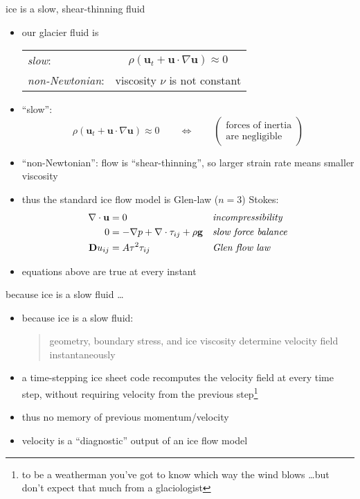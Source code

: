 \documentclass[hide notes,intlimits]{beamer}
\begin{document}
\begin{frame}{ice is a slow, shear-thinning fluid}

\begin{itemize}
\item our glacier fluid is
\smallskip

  \begin{tabular}{lc}
  \emph{slow}: & $\rho \left(\mathbf{u}_t + \mathbf{u}\cdot\nabla \mathbf{u}\right) \approx 0$ \\
  \emph{non-Newtonian}: & viscosity $\nu$ is not constant
  \end{tabular}
\item ``slow'':
  $$\rho \left(\mathbf{u}_t + \mathbf{u}\cdot\nabla \mathbf{u}\right) \approx 0 \qquad \iff \qquad \begin{pmatrix} \text{forces of inertia} \\ \text{are negligible} \end{pmatrix}$$
\item ``non-Newtonian'': flow is ``shear-thinning'', so larger strain rate means smaller viscosity
\item thus the standard ice flow model is Glen-law ($n=3$) Stokes:
\begin{align*}
\nabla \cdot \mathbf{u} &= 0 &&\text{\emph{incompressibility}} \\
0 &= - \nabla p + \nabla \cdot \tau_{ij} + \rho \mathbf{g} &&\text{\emph{slow force balance}} \\
\mathbf{D}u_{ij} &= A \tau^2 \tau_{ij} &&\text{\emph{Glen flow law}}
\end{align*}
\item equations above are true at every instant
\end{itemize}
\end{frame}


\begin{frame}{because ice is a slow fluid \dots}

\begin{itemize}
\item because ice is a slow fluid:
  \begin{quote}
  \alert{geometry, boundary stress, and ice viscosity determine velocity field instantaneously}
  \end{quote}
\item a time-stepping ice sheet code recomputes the velocity field at every time step, without requiring velocity from the previous step\footnote{to be a weatherman you've got to know which way the wind blows \dots but don't expect that much from a glaciologist}
\item thus no memory of previous momentum/velocity
\item velocity is a ``diagnostic'' output of an ice flow model
\end{itemize}
\end{frame}
\end{document}
